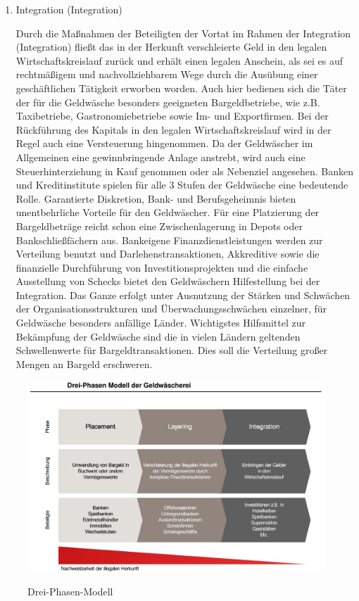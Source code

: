 \documentclass{article}
\begin{document}
\begin{enumerate}
                    \item Integration (Integration)

                        Durch die Maßnahmen der Beteiligten der Vortat im Rahmen der Integration (Integration) fließt das in der Herkunft verschleierte Geld in den legalen Wirtschaftskreislauf zurück und erhält einen legalen Anschein, als sei es auf rechtmäßigem und nachvollziehbarem Wege durch die Ausübung einer geschäftlichen Tätigkeit erworben worden. Auch hier bedienen sich die Täter der für die Geldwäsche besonders geeigneten Bargeldbetriebe, wie z.B. Taxibetriebe, Gastronomiebetriebe sowie Im- und Exportfirmen.
                        Bei der Rückführung des Kapitals in den legalen Wirtschaftskreislauf wird in der Regel auch eine Versteuerung hingenommen. Da der Geldwäscher im Allgemeinen eine gewinnbringende Anlage anstrebt, wird auch eine Steuerhinterziehung in Kauf genommen oder als Nebenziel angesehen.
                        Banken und Kreditinstitute spielen für alle 3 Stufen der Geldwäsche eine bedeutende Rolle. Garantierte Diskretion, Bank- und Berufsgeheimnis bieten unentbehrliche Vorteile für den Geldwäscher. Für eine Platzierung der Bargeldbeträge reicht schon eine Zwischenlagerung in Depots oder Bankschließfächern aus. Bankeigene Finanzdienstleistungen werden zur Verteilung benutzt und Darlehenstransaktionen, Akkreditive sowie die finanzielle Durchführung von Investitionsprojekten und die einfache Ausstellung von Schecks bietet den Geldwäschern Hilfestellung bei der Integration. Das Ganze erfolgt unter Ausnutzung der Stärken und Schwächen der Organisationsstrukturen und Überwachungsschwächen einzelner, für Geldwäsche besonders anfällige Länder.
                        Wichtigstes Hilfsmittel zur Bekämpfung der Geldwäsche sind die in vielen Ländern geltenden Schwellenwerte für Bargeldtransaktionen. Dies soll die Verteilung großer Mengen an Bargeld erschweren.

                \end{enumerate}
               
                \begin{figure}
                    \centering
                  \includegraphics[scale=0.3]{../../turandon/data/drei_phasen_modell.png}
                    \caption{Drei-Phasen-Modell}
                    \label{fig2}
                                    \cite{Abb1}
                \end{figure}
\end{document}
